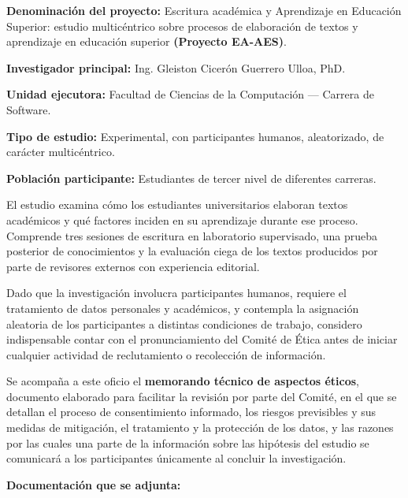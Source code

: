 \documentclass[11pt,a4paper]{article}
\newenvironment{recuadro}
	{\begin{lrbox}{\cajaguardada}\begin{minipage}{\dimexpr\textwidth-2\fboxsep\relax}\vspace{4pt}\small}
	{\vspace{4pt}\end{minipage}\end{lrbox}\par\vspace{4pt}\noindent\colorbox{grisclaro}{\usebox{\cajaguardada}}\par\vspace{6pt}}
\begin{document}
\begin{recuadro}
\textbf{Denominaci\'on del proyecto:} Escritura acad\'emica y Aprendizaje en Educación Superior: estudio multic\'entrico sobre procesos de elaboraci\'on de textos y aprendizaje en educaci\'on superior \textbf{(Proyecto EA-AES)}.

\vspace{4pt}
\textbf{Investigador principal:} Ing. Gleiston Cicer\'on Guerrero Ulloa, PhD.

\vspace{4pt}
\textbf{Unidad ejecutora:} Facultad de Ciencias de la Computaci\'on --- Carrera de Software.

\vspace{4pt}
\textbf{Tipo de estudio:} Experimental, con participantes humanos, aleatorizado, de car\'acter multic\'entrico.

\vspace{4pt}
\textbf{Poblaci\'on participante:} Estudiantes de tercer nivel de diferentes carreras.
\end{recuadro}

El estudio examina c\'omo los estudiantes universitarios elaboran textos acad\'emicos y qu\'e factores inciden en su aprendizaje durante ese proceso. Comprende tres sesiones de escritura en laboratorio supervisado, una prueba posterior de conocimientos y la evaluaci\'on ciega de los textos producidos por parte de revisores externos con experiencia editorial.

Dado que la investigaci\'on involucra participantes humanos, requiere el tratamiento de datos personales y acad\'emicos, y contempla la asignaci\'on aleatoria de los participantes a distintas condiciones de trabajo, considero indispensable contar con el pronunciamiento del Comit\'e de \'Etica antes de iniciar cualquier actividad de reclutamiento o recolecci\'on de informaci\'on.

Se acompa\~na a este oficio el \textbf{memorando t\'ecnico de aspectos \'eticos}, documento elaborado para facilitar la revisi\'on por parte del Comit\'e, en el que se detallan el proceso de consentimiento informado, los riesgos previsibles y sus medidas de mitigaci\'on, el tratamiento y la protecci\'on de los datos, y las razones por las cuales una parte de la informaci\'on sobre las hip\'otesis del estudio se comunicar\'a a los participantes \'unicamente al concluir la investigaci\'on.

\vspace{4pt}
\textbf{Documentaci\'on que se adjunta:}
\end{document}
